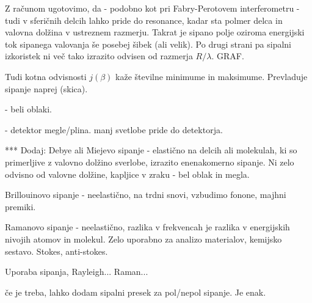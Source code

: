 Z računom ugotovimo, da - podobno kot pri Fabry-Perotovem interferometru - tudi v sferičnih delcih
lahko pride do resonance, kadar sta polmer delca in valovna dolžina v ustreznem razmerju. Takrat 
je sipano polje oziroma energijski tok sipanega valovanja še posebej šibek (ali velik). Po drugi
strani  pa sipalni izkoristek ni več tako izrazito odvisen od razmerja $R/\lambda$. GRAF. 

Tudi kotna odvisnosti $j(\beta)$ kaže številne minimume in maksimume. Prevladuje sipanje naprej (skica).


- beli oblaki.

- detektor megle/plina. manj svetlobe pride do detektorja.

***
Dodaj: 
Debye ali Miejevo sipanje - elastično na delcih ali molekulah, ki so primerljive
z valovno dolžino sverlobe, izrazito enenakomerno sipanje. Ni zelo odvisno od
valovne dolžine, kapljice v zraku - bel oblak in megla. 

Brillouinovo sipanje - neelastično, na trdni snovi, vzbudimo fonone, majhni premiki.

Ramanovo sipanje - neelastično, razlika v frekvencah je razlika v energijskih 
nivojih atomov in molekul. Zelo uporabno za analizo materialov, kemijsko sestavo.
Stokes, anti-stokes. 

Uporaba sipanja, Rayleigh... Raman... 

če je treba, lahko dodam sipalni presek za pol/nepol sipanje. Je enak.
